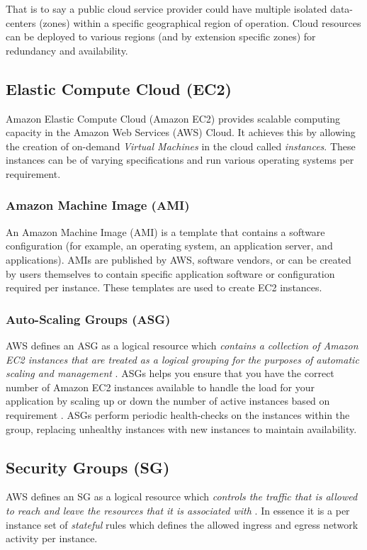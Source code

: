 That is to say a public cloud service provider could have multiple isolated data-centers (zones) within a specific geographical region of operation.
Cloud resources can be deployed to various regions (and by extension specific zones) for redundancy and availability.

\subsection{Elastic Compute Cloud (EC2)}
Amazon Elastic Compute Cloud (Amazon EC2) provides scalable computing capacity in the Amazon Web Services (AWS) Cloud\cite{awsdocs_whatsisec2}.
It achieves this by allowing the creation of on-demand \emph{Virtual Machines} in the cloud called \emph{instances}\cite{carty_2019}. 
These instances can be of varying specifications \cite{daly_2022} and run various operating systems \cite{awsdocs_ec2os} per requirement.

\subsubsection{Amazon Machine Image (AMI)}
An Amazon Machine Image (AMI) is a template that contains a software configuration (for example, an operating system, an application server, and applications)\cite{awsdocs_ami}.
AMIs are published by AWS, software vendors, or can be created by users themselves to contain specific application software or configuration required per instance.
These templates are used to create EC2 instances\cite{Beach2014}. 

\subsubsection{Auto-Scaling Groups (ASG)}
AWS defines an ASG as a logical resource which \emph{contains a collection of Amazon EC2 instances that are treated as a logical grouping for the purposes of automatic scaling and management} \cite{awsdocs_asg}.
ASGs helps you ensure that you have the correct number of Amazon EC2 instances available to handle the load for your application by scaling up or down the number of active instances based on requirement \cite{amazon_asg_docs}. 
ASGs perform periodic health-checks on the instances within the group, replacing unhealthy instances with new instances to maintain availability.

\subsection{Security Groups (SG)}
AWS defines an SG as a logical resource which \emph{controls the traffic that is allowed to reach and leave the resources that it is associated with} \cite{amazon_2016}.
In essence it is a per instance set of \emph{stateful} rules which defines the allowed ingress and egress network activity per instance. 

